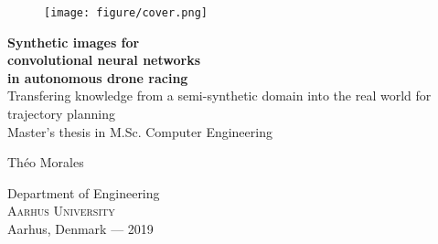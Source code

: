 
\begin{titlepage}
			
\addtolength{\voffset}{2cm}

\begin{figure}[H]
\centering
\vspace{2cm}	%
\texttt{[image: figure/cover.png]}
\end{figure}

\mbox{}
\vfill
\renewcommand{\familydefault}{\sfdefault} \normalfont %
\textbf{{\Huge 	Synthetic images for \\[0.2cm] 
		convolutional neural networks \\[0.3cm]
		in autonomous drone racing }} 	\\[0.5cm]
{\Large Transfering knowledge from a semi-synthetic domain into the real world
for trajectory planning}\\[0.5cm]
Master's thesis in M.Sc. Computer Engineering \setlength{\parskip}{1cm}

{\Large Théo Morales \setlength{\parskip}{2.9cm}}

Department of Engineering \\
\textsc{Aarhus University} \\
Aarhus, Denmark — 2019

\renewcommand{\familydefault}{\rmdefault} \normalfont %
\end{titlepage}




